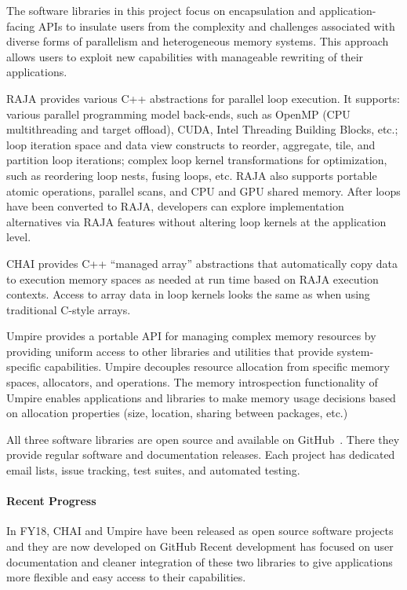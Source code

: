 The software libraries in this project focus on encapsulation and 
application-facing APIs to insulate users from the complexity and 
challenges associated with diverse forms of parallelism and heterogeneous 
memory systems. This approach allows users to exploit new capabilities 
with manageable rewriting of their applications.

RAJA provides various C++ abstractions for parallel loop execution. It
supports: various parallel programming model back-ends, such as OpenMP 
(CPU multithreading and target offload), CUDA, Intel Threading Building Blocks,
etc.; loop iteration space and data view constructs to reorder, 
aggregate, tile, and partition loop iterations; complex loop kernel 
transformations for optimization, such as reordering loop nests, fusing 
loops, etc. RAJA also supports portable atomic operations, parallel scans, 
and CPU and GPU shared memory. After loops have been converted to RAJA, 
developers can explore implementation alternatives via RAJA features without 
altering loop kernels at the application level.

CHAI provides C++ ``managed array'' abstractions that automatically copy 
data to execution memory spaces as needed at run time based on RAJA execution 
contexts. Access to array data in loop kernels looks the same as when using
traditional C-style arrays.

Umpire provides a portable API for managing complex memory resources by 
providing uniform access to other libraries and utilities that provide
system-specific capabilities. Umpire decouples resource allocation from 
specific memory spaces, allocators, and operations. The memory introspection 
functionality of Umpire enables applications and libraries to make memory 
usage decisions based on allocation properties (size, location, sharing 
between packages, etc.)

All three software libraries are open source and available on
GitHub~\cite{RAJA-github, CHAI-github, Umpire-github}. There they provide
regular software and documentation releases. Each project has dedicated email
lists, issue tracking, test suites, and automated testing.

\paragraph{Recent Progress}

In FY18, CHAI and Umpire have been released as open source software projects
and they are now developed on GitHub Recent development has focused on 
user documentation and cleaner integration of these two libraries to give 
applications more flexible and easy access to their capabilities.

